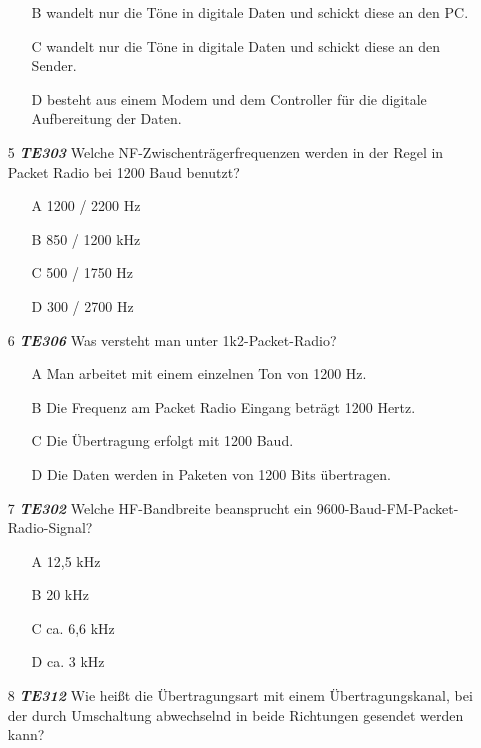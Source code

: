 \begin{enumerate}
\begin{enumerate}
		\item[B] wandelt nur die Töne in digitale Daten und schickt diese an den PC.
		\item[C] wandelt nur die Töne in digitale Daten und schickt diese an den Sender.
		\item[D] besteht aus einem Modem und dem Controller für die digitale Aufbereitung der Daten.
		\end{enumerate} 	
	\item[5] \emph{\textbf{TE303}}  Welche NF-Zwischenträgerfrequenzen werden in der Regel in Packet Radio bei 1200 Baud benutzt?
	\begin{enumerate}
	\itemsep1pt\parskip0pt
		\item[A] 1200 / 2200 Hz
		\item[B] 850 / 1200 kHz
		\item[C] 500 / 1750 Hz
		\item[D] 300 / 2700 Hz
		\end{enumerate} 
	\item[6] \emph{\textbf{TE306}}  Was versteht man unter 1k2-Packet-Radio?
	\begin{enumerate}
	\itemsep1pt\parskip0pt
		\item[A] Man arbeitet mit einem einzelnen Ton von 1200 Hz.
		\item[B] Die Frequenz am Packet Radio Eingang beträgt 1200 Hertz.
		\item[C] Die Übertragung erfolgt mit 1200 Baud.
		\item[D] Die Daten werden in Paketen von 1200 Bits übertragen.
		\end{enumerate} 
	\item[7] \emph{\textbf{TE302 }}  Welche HF-Bandbreite beansprucht ein 9600-Baud-FM-Packet-Radio-Signal?
	\begin{enumerate}
	\itemsep1pt\parskip0pt
		\item[A] 12,5 kHz 
		\item[B] 20 kHz 
		\item[C] ca. 6,6 kHz
		\item[D] ca. 3 kHz
		\end{enumerate} 
	\item[8] \emph{\textbf{TE312}} Wie heißt die Übertragungsart mit einem Übertragungskanal, bei der durch Umschaltung abwechselnd in beide Richtungen gesendet werden kann?
	\begin{enumerate}
	\itemsep1pt\parskip0pt

\end{enumerate}
\end{enumerate}
